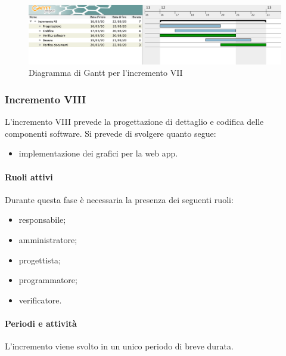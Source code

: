 		\begin{landscape}
          \begin{figure}[H]
            \centering
            \includegraphics[width=\linewidth]{images/gantt/incrementoVII} %
            \caption{Diagramma di Gantt per l'incremento VII}
          \end{figure}		
		\end{landscape}


		\subsubsection{Incremento VIII}
			
			L'incremento VIII prevede la progettazione di dettaglio e codifica delle componenti software. Si prevede di svolgere quanto segue:
			\begin{itemize}
				\item implementazione dei grafici per la web app.
			\end{itemize}
			
			\paragraph{Ruoli attivi}
			
				Durante questa fase è necessaria la presenza dei seguenti ruoli:
				\begin{itemize}
					\item responsabile;
					\item amministratore;
					\item progettista;
					\item programmatore;
					\item verificatore.
				\end{itemize}
			
			\paragraph{Periodi e attività}
			
				L'incremento viene svolto in un unico periodo di breve durata.
				
